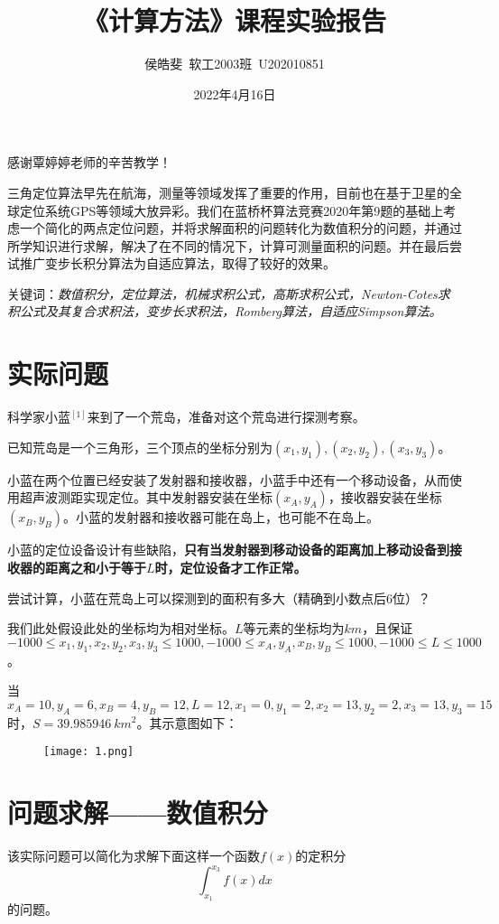 \documentclass[UTF8]{ctexart}
\title{《计算方法》课程实验报告}
\author{侯皓斐\ 软工2003班\ U202010851}
\date{2022年4月16日}
\begin{document}
	\maketitle
	
	感谢覃婷婷老师的辛苦教学！
	
	三角定位算法早先在航海，测量等领域发挥了重要的作用，目前也在基于卫星的全球定位系统GPS等领域大放异彩。我们在蓝桥杯算法竞赛2020年第9题的基础上考虑一个简化的两点定位问题，并将求解面积的问题转化为数值积分的问题，并通过所学知识进行求解，解决了在不同的情况下，计算可测量面积的问题。并在最后尝试推广变步长积分算法为自适应算法，取得了较好的效果。
	
	关键词：\textit{数值积分，定位算法，机械求积公式，高斯求积公式，Newton-Cotes求积公式及其复合求积法，变步长求积法，Romberg算法，自适应Simpson算法。}
	
	
	\newpage
	\tableofcontents
	\newpage
	\section{实际问题}
	科学家小蓝${}^{[1]}$来到了一个荒岛，准备对这个荒岛进行探测考察。
	
	已知荒岛是一个三角形，三个顶点的坐标分别为$(x_1, y_1), (x_2, y_2), (x_3, y_3)$。
	
	小蓝在两个位置已经安装了发射器和接收器，小蓝手中还有一个移动设备，从而使用超声波测距实现定位。其中发射器安装在坐标$(x_A, y_A)$，接收器安装在坐标$(x_B, y_B)$。小蓝的发射器和接收器可能在岛上，也可能不在岛上。
	
	小蓝的定位设备设计有些缺陷，\textbf{只有当发射器到移动设备的距离加上移动设备到接收器的距离之和小于等于$L$时，定位设备才工作正常。}
	
	尝试计算，小蓝在荒岛上可以探测到的面积有多大（精确到小数点后6位）？
	
	我们此处假设此处的坐标均为相对坐标。$L$等元素的坐标均为$km$，且保证$-1000 \leq x_1, y_1, x_2, y_2, x_3, y_3 \leq1000,-1000 \leq x_A, y_A, x_B, y_B \leq1000,  -1000  \leq L \leq1000$。
	
	当$x_A = 10, y_A = 6, x_B = 4, y_B =  12, L =  12, x_1 =  0, y_1 =  2, x_2 =  13, y_2 =  2, x_3 =  13, y_3 =  15$时，$S = 39.985946\ km^2$。其示意图如下：
	
	\begin{figure}[h]
		\centerline{\texttt{[image: 1.png]}}
	\end{figure}
	\newpage
	\section{问题求解——数值积分}
	该实际问题可以简化为求解下面这样一个函数$f(x)$的定积分
	\[\int_{x_1}^{x_3} f(x) dx\]
	的问题。
	
\end{document}
